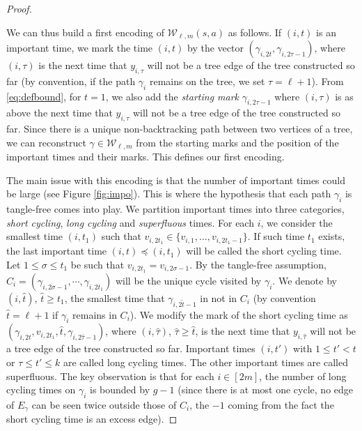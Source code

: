 \documentclass[11pt]{article}
\newcommand{\cE}{E}
\newcommand{\cW}{\mathcal {W}}
\newcommand{\1}{1\!\!{\sf I}}\newcommand{\IND}{\1}
\begin{document}
\begin{proof}
\begin{figure}[htb]
\begin{center}
\end{center}\end{figure}

We can thus build a first encoding of $\cW_{\ell,m}(s,a)$ as follows. If $(i,t)$ is an  important time, we mark the time $(i,t)$  by the vector $(\gamma_{i,2t},\gamma_{i,2\tau-1})$, where $(i,\tau)$ is the next time that $y_{i,\tau}$ will not be a tree edge of the tree constructed so far (by convention, if the path $\gamma_i$ remains on the tree, we set $\tau = \ell+1$). From \eqref{eq:defbound}, for $t=1$, we also add the {\em starting mark} $\gamma_{i,2\tau-1}$ where $(i,\tau)$ is as above the next time that $y_{i,\tau}$ will not be a tree edge of the tree constructed so far.  Since there is a unique non-backtracking path between two vertices of a tree, we can reconstruct $\gamma \in \cW_{\ell,m}$ from the starting marks and the position of the important times and their marks. This defines our first encoding. 







The main issue with this encoding is that the number of important times could be large  (see Figure \ref{fig:impo}). This is where the hypothesis that each path $\gamma_i$ is tangle-free comes into play. We  partition important times into three categories, {\em short cycling}, {\em long cycling} and {\em superfluous} times. For each $i$, we consider the smallest time $(i,t_1)$ such that $v_{i,2t_1} \in \{ v_{i,1}, \ldots, v_{i,2t_1-1} \}$. If such time $t_1$ exists, the last important time $(i,t) \preceq (i,t_1)$ will be called the short cycling time.  Let $1 \leq \sigma \leq t_1$ be such that $v_{i,2t_1} = v_{i,2\sigma -1}$. By the tangle-free assumption, $C_i = (\gamma_{i,2\sigma-1},\cdots, \gamma_{i,2t_1})$ will be the unique cycle visited by $\gamma_i$.  We denote by $(i,\hat t)$, $\hat t \geq t_1$, the smallest time that $\gamma_{i,2\hat t-1}$ in not in $C_i$ (by convention $\hat t = \ell+1$ if $\gamma_i$ remains in $C_i$). We modify the mark of the short cycling time as  $(\gamma_{i,2t}, v_{i,2t_1}, \hat t ,\gamma_{i,2\hat \tau-1})$, where $(i,\hat \tau)$, $\hat \tau \geq \hat t$, is the next time that $y_{i,\hat \tau}$ will not be a tree edge of the tree constructed so far. Important times $(i,t')$ with $1 \leq t' < t$ or $\tau \leq t' \leq k$ are called long cycling times. The other important times are called superfluous. The key observation  is that for each $i \in [2 m]$, the number of long cycling times on $\gamma_i$ is bounded by  $g-1$ (since there is at most one cycle, no edge of $\cE_\gamma$ can be seen twice outside those of $C_i$, the $-1$ coming from the fact the short cycling time is an excess edge). 


\end{proof}
\end{document}
